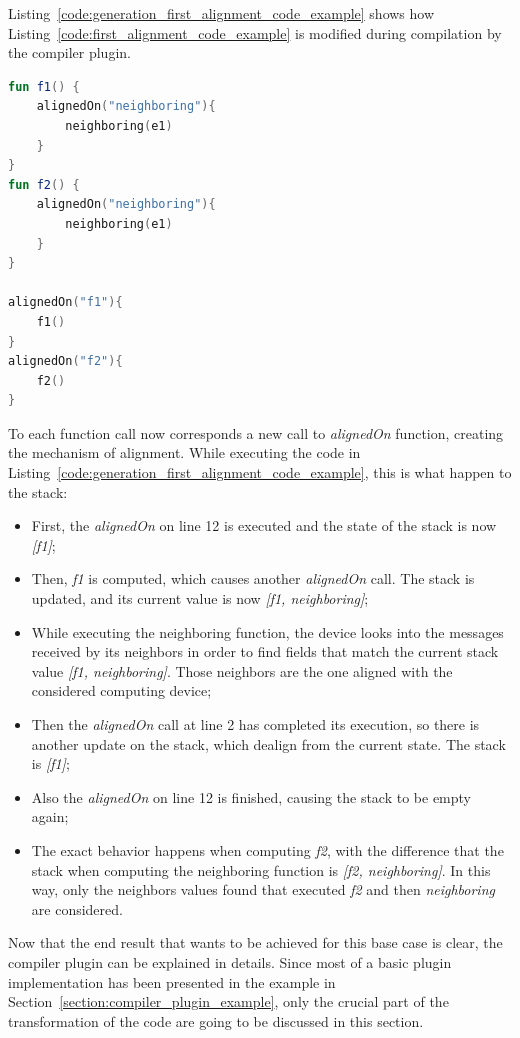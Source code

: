 Listing~\ref{code:generation_first_alignment_code_example} shows how Listing~\ref{code:first_alignment_code_example} is modified during compilation by the compiler plugin.
\begin{lstlisting}[caption={Generation goal to handle the alignment of Listing~\ref{code:first_alignment_code_example}}, captionpos=b, language=Kotlin, label={code:generation_first_alignment_code_example}]
fun f1() {
    alignedOn("neighboring"){
        neighboring(e1)
    }
}
fun f2() {
    alignedOn("neighboring"){
        neighboring(e1)
    }
}
            
alignedOn("f1"){
    f1()
}
alignedOn("f2"){
    f2()
}
\end{lstlisting}
To each function call now corresponds a new call to \textit{alignedOn} function, creating the mechanism of alignment.\newline
While executing the code in Listing~\ref{code:generation_first_alignment_code_example}, this is what happen to the stack:
\begin{itemize}
    \item First, the \textit{alignedOn} on line 12 is executed and the state of the stack is now \textit{[f1]};
    \item Then, \textit{f1} is computed, which causes another \textit{alignedOn} call. The stack is updated, and its current value is now \textit{[f1, neighboring]};
    \item While executing the neighboring function, the device looks into the messages received by its neighbors in order to find fields that match the current stack value \textit{[f1, neighboring]}. Those neighbors are the one aligned with the considered computing device;
    \item Then the \textit{alignedOn} call at line 2 has completed its execution, so there is another update on the stack, which dealign from the current state. The stack is \textit{[f1]};
    \item Also the \textit{alignedOn} on line 12 is finished, causing the stack to be empty again;
    \item The exact behavior happens when computing \textit{f2}, with the difference that the stack when computing the neighboring function is \textit{[f2, neighboring]}. In this way, only the neighbors values found that executed \textit{f2} and then \textit{neighboring} are considered.
\end{itemize}

Now that the end result that wants to be achieved for this base case is clear, the compiler plugin can be explained in details.\newline
Since most of a basic plugin implementation has been presented in the example in Section~\ref{section:compiler_plugin_example}, only the crucial part of the transformation of the code are going to be discussed in this section.

